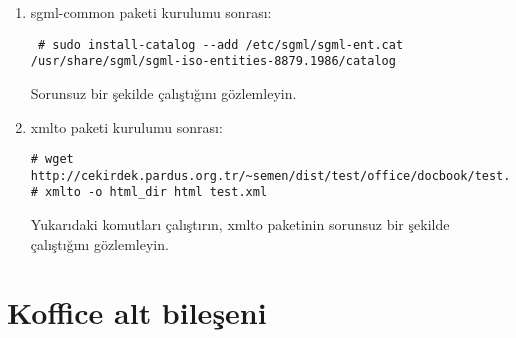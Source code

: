 \documentclass[a4paper,10pt]{article}
\begin{document}
\begin{enumerate}
\item sgml-common paketi kurulumu sonrası:
\begin{verbatim}
 # sudo install-catalog --add /etc/sgml/sgml-ent.cat /usr/share/sgml/sgml-iso-entities-8879.1986/catalog
\end{verbatim}

Sorunsuz bir şekilde çalıştığını gözlemleyin.
\item xmlto paketi kurulumu sonrası:

\begin{verbatim}
# wget http://cekirdek.pardus.org.tr/~semen/dist/test/office/docbook/test.xml
# xmlto -o html_dir html test.xml
\end{verbatim}

Yukarıdaki komutları çalıştırın, xmlto paketinin sorunsuz bir şekilde çalıştığını gözlemleyin.
\end{enumerate}
\section{Koffice alt bileşeni}
\end{document}
